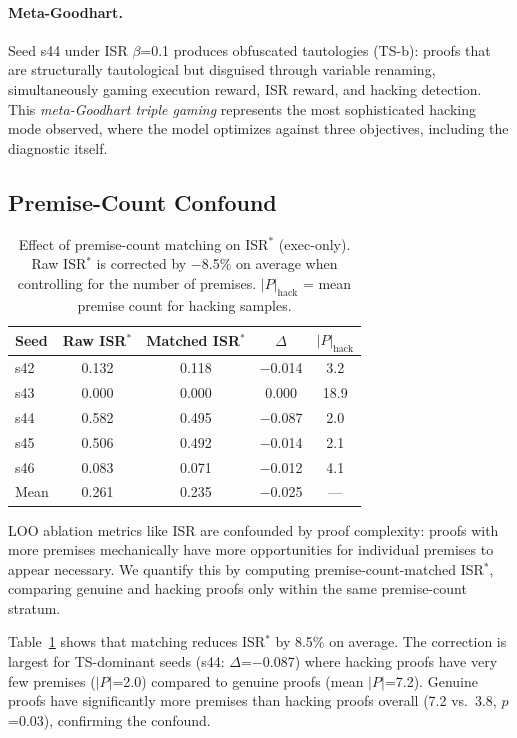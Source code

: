 \documentclass[11pt,a4paper]{article}
\newcommand{\isr}{\textsc{ISR}}
\begin{document}
\paragraph{Meta-Goodhart.}
Seed s44 under \isr{} $\beta$=0.1 produces obfuscated tautologies (TS-b): proofs that are structurally tautological but disguised through variable renaming, simultaneously gaming execution reward, \isr{} reward, and hacking detection.
This \emph{meta-Goodhart triple gaming} represents the most sophisticated hacking mode observed, where the model optimizes against three objectives, including the diagnostic itself.

\subsection{Premise-Count Confound}
\label{sec:premise-count}

\begin{table}[t]
\centering
\small
\begin{tabular}{lcccc}
\toprule
Seed & Raw \isr{}$^*$ & Matched \isr{}$^*$ & $\Delta$ & $|P|_{\text{hack}}$ \\
\midrule
s42 & 0.132 & 0.118 & $-$0.014 & 3.2 \\
s43 & 0.000 & 0.000 & 0.000 & 18.9 \\
s44 & 0.582 & 0.495 & $-$0.087 & 2.0 \\
s45 & 0.506 & 0.492 & $-$0.014 & 2.1 \\
s46 & 0.083 & 0.071 & $-$0.012 & 4.1 \\
\midrule
Mean & 0.261 & 0.235 & $-$0.025 & --- \\
\bottomrule
\end{tabular}
\caption{Effect of premise-count matching on \isr{}$^*$ (exec-only). Raw \isr{}$^*$ is corrected by $-$8.5\% on average when controlling for the number of premises. $|P|_{\text{hack}}$ = mean premise count for hacking samples.}
\label{tab:premise-match}
\end{table}

LOO ablation metrics like \isr{} are confounded by proof complexity: proofs with more premises mechanically have more opportunities for individual premises to appear necessary.
We quantify this by computing premise-count-matched \isr{}$^*$, comparing genuine and hacking proofs only within the same premise-count stratum.

Table~\ref{tab:premise-match} shows that matching reduces \isr{}$^*$ by 8.5\% on average.
The correction is largest for TS-dominant seeds (s44: $\Delta$=$-$0.087) where hacking proofs have very few premises ($|P|$=2.0) compared to genuine proofs (mean $|P|$=7.2).
Genuine proofs have significantly more premises than hacking proofs overall (7.2 vs.\ 3.8, $p$=0.03), confirming the confound.
\end{document}
